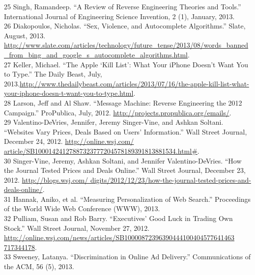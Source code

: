 25 Singh, Ramandeep. ``A Review of Reverse Engineering Theories and Tools.'' International Journal of Engineering Science Invention, 2 (1), January, 2013. \\
26 Diakopoulos, Nicholas. ``Sex, Violence, and Autocomplete Algorithms.'' Slate, August, 2013. \href{http://www.slate.com/articles/technology/future_tense/2013/08/words_banned_from_bing_and_google_s_autocomplete_algorithms.html}{http://www.slate.com/articles/technology/future_tense/2013/08/words_banned_from_bing_and_google_s_autocomplete_algorithms.html}.\\
27 Keller, Michael. ``The Apple ‘Kill List': What Your iPhone Doesn't Want You to Type.'' The Daily Beast, July, 2013.\href{http://www.thedailybeast.com/articles/2013/07/16/the-apple-kill-list-what-your-iphone-doesn-t-want-you-to-type.html}{http://www.thedailybeast.com/articles/2013/07/16/the-apple-kill-list-what-your-iphone-doesn-t-want-you-to-type.html}. \\
28 Larson, Jeff and Al Shaw. ``Message Machine: Reverse Engineering the 2012 Campaign.'' ProPublica, July, 2012. \href{http://projects.propublica.org/emails/}{http://projects.propublica.org/emails/}. \\
29 Valentino-DeVries, Jennifer, Jeremy Singer-Vine, and Ashkan Soltani. ``Websites Vary Prices, Deals Based on Users' Information.'' Wall Street Journal, December 24, 2012. \href{http://online.wsj.com/ article/SB10001424127887323777204578189391813881534.html#}{http://online.wsj.com/ article/SB10001424127887323777204578189391813881534.html#}. \\
30 Singer-Vine, Jeremy, Ashkan Soltani, and Jennifer Valentino-DeVries. ``How the Journal Tested Prices and Deals Online.'' Wall Street Journal, December 23, 2012. \href{http://blogs.wsj.com/ digits/2012/12/23/how-the-journal-tested-prices-and-deals-online/}{http://blogs.wsj.com/ digits/2012/12/23/how-the-journal-tested-prices-and-deals-online/}. \\
31 Hannak, Aniko, et al. ``Measuring Personalization of Web Search.'' Proceedings of the World Wide Web Conference (WWW), 2013. \\
32 Pulliam, Susan and Rob Barry. ``Executives' Good Luck in Trading Own Stock.'' Wall Street Journal, November 27, 2012. \href{http://online.wsj.com/news/articles/SB10000872396390444100404577641463 717344178}{http://online.wsj.com/news/articles/SB10000872396390444100404577641463 717344178}. \\
33 Sweeney, Latanya. ``Discrimination in Online Ad Delivery.'' Communications of the ACM, 56 (5), 2013. \\
